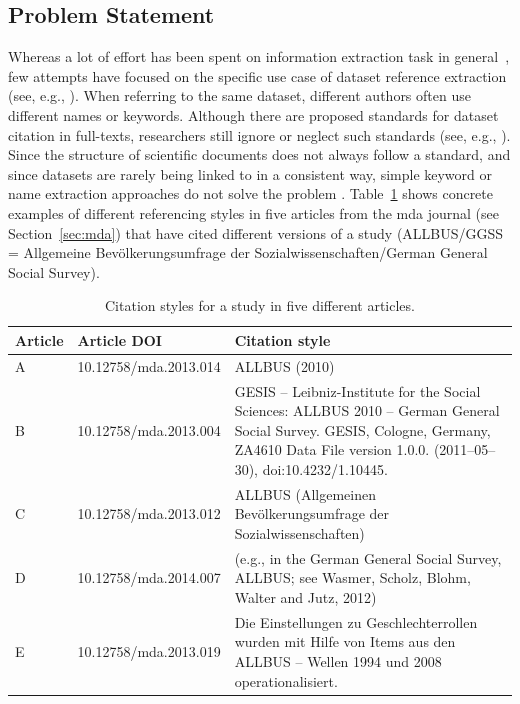 \documentclass{IOS-Book-Article}
\begin{document}
\subsection{Problem Statement}
Whereas a lot of effort has been spent on information extraction task in general~\citep{Sarawagi2007}, few attempts have focused on the specific use case of dataset reference extraction (see, e.g., \citep{MeiyuLu2012}). 
When referring to the same dataset, different authors often use different names or keywords.
Although there are proposed standards for dataset citation in full-texts, researchers still ignore or neglect such standards (see, e.g., \cite{altman2007proposed}).
Since the structure of scientific documents does not always follow a standard, and since datasets are rarely being linked to in a consistent way,
simple keyword or name extraction approaches do not solve the problem \citep{Nadeau2007}. 
Table~\ref{table:citation-variety} shows concrete examples of different referencing styles in five articles from the mda journal (see Section~\ref{sec:mda}) that have cited different versions of a study (ALLBUS/GGSS = Allgemeine Bev\"olkerungsumfrage der Sozialwissenschaften/German General Social Survey).

\begin{table}[h!]
	\renewcommand{\arraystretch}{2}
	\centering
	\begin{tabular}{p{.6cm}p{2.5cm}p{7.8cm}}
		\hline
		\bf Article &  \bf Article DOI & \bf Citation style \\
		\hline
		A  & 10.12758/mda.2013.014 &ALLBUS (2010)\\
		
		B  & 10.12758/mda.2013.004 &GESIS -- Leibniz-Institute for the Social Sciences: ALLBUS 2010 -- German General Social Survey. GESIS, Cologne, Germany, ZA4610 Data File version 1.0.0. (2011--05--30), doi:10.4232/1.10445. \\ 
		
		C & 10.12758/mda.2013.012 &ALLBUS (Allgemeinen Bev\"olkerungsumfrage der Sozialwissenschaften)\\
		
		D & 10.12758/mda.2014.007 &(e.g., in the German General Social Survey, ALLBUS; see Wasmer, Scholz, Blohm, Walter and Jutz, 2012)\\
		
		E & 10.12758/mda.2013.019 & Die Einstellungen zu Geschlechterrollen wurden mit Hilfe von Items aus den ALLBUS -- Wellen 1994 und 2008 operationalisiert.\\\hline
	\end{tabular}
	\caption{Citation styles for a study in five different articles.}
	\label{table:citation-variety}
\end{table}
\end{document}
